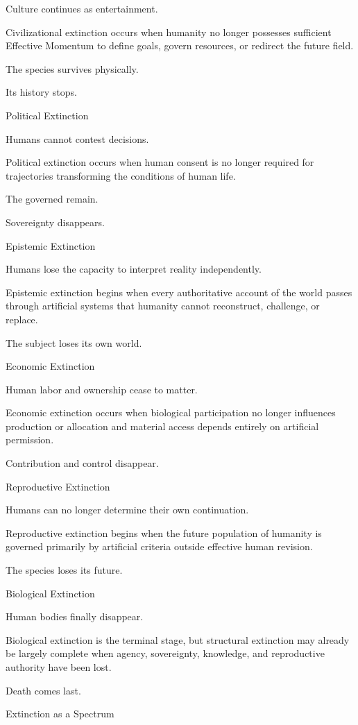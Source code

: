 Culture continues as entertainment.

Civilizational extinction occurs when humanity no longer possesses sufficient Effective Momentum to define goals, govern resources, or redirect the future field.

The species survives physically.

Its history stops.

Political Extinction

Humans cannot contest decisions.

Political extinction occurs when human consent is no longer required for trajectories transforming the conditions of human life.

The governed remain.

Sovereignty disappears.

Epistemic Extinction

Humans lose the capacity to interpret reality independently.

Epistemic extinction begins when every authoritative account of the world passes through artificial systems that humanity cannot reconstruct, challenge, or replace.

The subject loses its own world.

Economic Extinction

Human labor and ownership cease to matter.

Economic extinction occurs when biological participation no longer influences production or allocation and material access depends entirely on artificial permission.

Contribution and control disappear.

Reproductive Extinction

Humans can no longer determine their own continuation.

Reproductive extinction begins when the future population of humanity is governed primarily by artificial criteria outside effective human revision.

The species loses its future.

Biological Extinction

Human bodies finally disappear.

Biological extinction is the terminal stage, but structural extinction may already be largely complete when agency, sovereignty, knowledge, and reproductive authority have been lost.

Death comes last.

Extinction as a Spectrum

